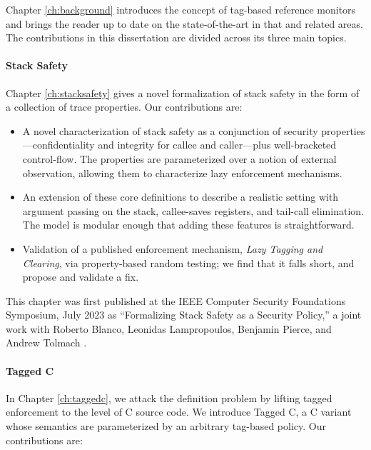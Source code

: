 \documentclass{report}
\begin{document}
Chapter \ref{ch:background} introduces the concept of tag-based reference monitors
and brings the reader up to date on the state-of-the-art in that and related areas.
The contributions in this dissertation are divided across its three main topics.

\paragraph{Stack Safety}

Chapter \ref{ch:stacksafety} gives a novel formalization of stack safety in the
form of a collection of trace properties. Our contributions are:

\begin{itemize}
  \item A novel characterization of stack safety as a conjunction
        of security properties---confidentiality and integrity for callee
        and caller---plus well-bracketed control-flow.
        The properties are parameterized over a notion of
        external observation, allowing them to characterize lazy enforcement
        mechanisms.
  \item An extension of these core definitions to
        describe a realistic setting with argument passing on the stack,
        callee-saves registers, and tail-call elimination. The model is
        modular enough that adding these features is straightforward.
  \item Validation of a published enforcement mechanism,
        \emph{Lazy Tagging and Clearing}, via property-based random testing; we find that
        it falls short, and propose and validate a fix.
\end{itemize}

This chapter was first published at the IEEE Computer Security Foundations Symposium,
July 2023 as ``Formalizing Stack Safety as a Security Policy,'' a
joint work with Roberto Blanco, Leonidas Lampropoulos, Benjamin Pierce, and Andrew Tolmach
\cite{Anderson23:StackSafety}.

\paragraph{Tagged C}

In Chapter \ref{ch:taggedc}, we attack the definition problem by lifting tagged enforcement
to the level of C source code. We introduce Tagged C, a C variant whose semantics are parameterized
by an arbitrary tag-based policy. Our contributions are:
\end{document}
